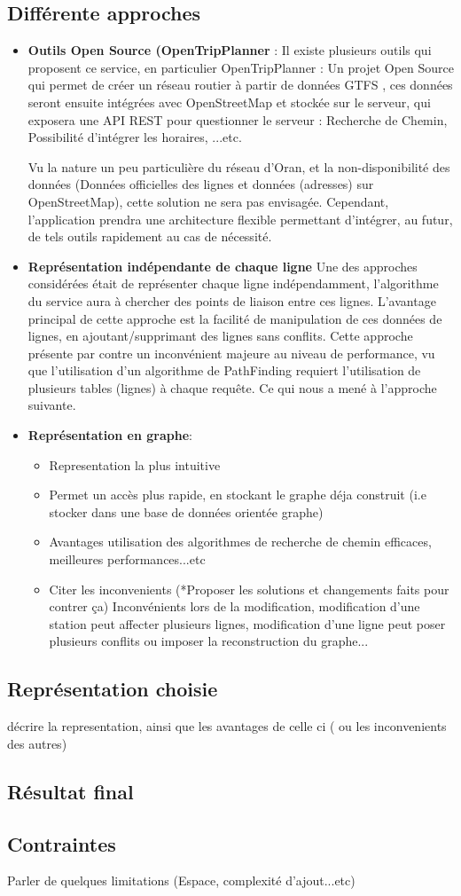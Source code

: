 	\subsection{Différente approches}
	\begin{itemize}
	\item \textbf{Outils Open Source (OpenTripPlanner} : 
		Il existe plusieurs outils qui proposent ce service, en particulier OpenTripPlanner : Un projet Open Source qui permet de créer un réseau routier à partir de données GTFS , ces données seront ensuite intégrées avec OpenStreetMap et stockée sur le serveur, qui exposera une API REST pour questionner le serveur : Recherche de Chemin, Possibilité d'intégrer les horaires, ...etc.
		
		Vu la nature un peu particulière du réseau d'Oran, et la non-disponibilité des données (Données officielles des lignes et données (adresses) sur OpenStreetMap), cette solution ne sera pas envisagée. 
		Cependant, l'application prendra une architecture flexible permettant d'intégrer, au futur, de tels outils rapidement au cas de nécessité.
	\item \textbf{Représentation indépendante de chaque ligne}
	Une des approches considérées était de représenter chaque ligne indépendamment, l'algorithme du service aura à chercher des points de liaison entre ces lignes.
	L'avantage principal de cette approche est la facilité de manipulation de ces données de lignes, en ajoutant/supprimant des lignes sans conflits.
	Cette approche présente par contre un inconvénient majeure au niveau de performance, vu que l'utilisation d'un algorithme de PathFinding requiert l'utilisation de plusieurs tables (lignes) à chaque requête. Ce qui nous a mené à l'approche suivante.
	\item \textbf{Représentation en graphe}:
	
	\begin{itemize}
	\item Representation la plus intuitive
	\item Permet un accès plus rapide, en stockant le graphe déja construit (i.e stocker dans une base de données orientée graphe)
	\item Avantages utilisation des algorithmes de recherche de chemin efficaces, meilleures performances...etc
	\item Citer les inconvenients (*Proposer les solutions et changements faits pour contrer ça) Inconvénients lors de la modification, modification d'une station peut affecter plusieurs lignes, modification d'une ligne peut poser plusieurs conflits ou imposer la reconstruction du graphe...
	\end{itemize}

	\end{itemize}
	\subsection{Représentation choisie}
	décrire la representation, ainsi que les avantages de celle ci ( ou les inconvenients des autres)
	\subsection{Résultat final}
	\subsection{Contraintes}
	Parler de quelques limitations (Espace, complexité d'ajout...etc)

				